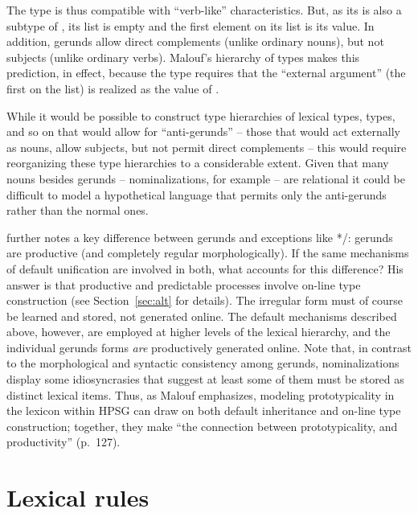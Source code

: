 \documentclass[output=paper,biblatex,babelshorthands,newtxmath,draftmode,colorlinks,citecolor=brown]{langscibook}
\begin{document}
\noindent
The type  is thus compatible with ``verb-like'' characteristics.
But, as its  is also a subtype of , its  list is empty and the first element on its  list is its  value. In addition, gerunds allow direct complements (unlike ordinary nouns), but not subjects (unlike ordinary verbs).
Malouf's hierarchy of types makes this prediction, in effect, because the  type requires that the ``external argument'' (the first on the  list) is realized as the value of .

\largerpage
While it would be possible to construct type hierarchies of lexical types,  types, and so on that would allow for ``anti-gerunds'' -- those that would act externally as nouns, allow subjects, but not permit direct complements -- this would require reorganizing these type hierarchies to a considerable extent.
Given that many nouns besides gerunds -- nominalizations, for example -- are relational it could be difficult to model a hypothetical language that permits only the anti-gerunds rather than the normal ones.

\citeauthor{Malouf2000a} further notes a key difference between gerunds and exceptions like */:  gerunds are productive (and completely regular morphologically).
If the same mechanisms of default unification are involved in both, what accounts for this difference?
His answer is that productive and predictable processes involve on-line type construction (see Section~\ref{sec:alt} for details).
The irregular form  must of course be learned and stored, not generated online.
The default mechanisms described above, however, are employed at higher levels of the lexical hierarchy, and the individual gerunds forms \emph{are} productively generated online.
Note that, in contrast to the morphological and syntactic consistency among gerunds,  nominalizations display some idiosyncrasies that suggest at least some of them must be stored as distinct lexical items.
Thus, as Malouf emphasizes, modeling prototypicality in the lexicon within HPSG can draw on both default inheritance and on-line type construction; together, they make ``the connection between prototypicality, and productivity'' (p.\ 127).

\section{Lexical rules}
\label{lexicon-sec-lexical-rules}
\end{document}
